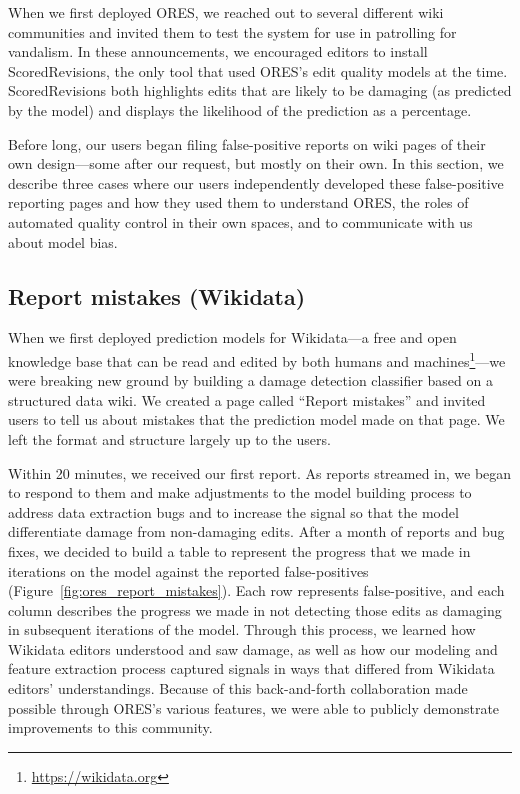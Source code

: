 When we first deployed ORES, we reached out to several different wiki communities and invited them to test the system for use in patrolling for vandalism.  In these announcements, we encouraged editors to install ScoredRevisions, the only tool that used ORES's edit quality models at the time.  ScoredRevisions both highlights edits that are likely to be damaging (as predicted by the model) and displays the likelihood of the prediction as a percentage.

Before long, our users began filing false-positive reports on wiki pages of their own design---some after our request, but mostly on their own.  In this section, we describe three cases where our users independently developed these false-positive reporting pages and how they used them to understand ORES, the roles of automated quality control in their own spaces, and to communicate with us about model bias.

\subsection{Report mistakes (Wikidata)}

When we first deployed prediction models for Wikidata---a free and open knowledge base that can be read and edited by both humans and machines\footnote{\url{https://wikidata.org}}---we were breaking new ground by building a damage detection classifier based on a structured data wiki\cite{sarabadani2017building}.  We created a page called ``Report mistakes'' and invited users to tell us about mistakes that the prediction model made on that page. We left the format and structure largely up to the users.

Within 20 minutes, we received our first report.  As reports streamed in, we began to respond to them and make adjustments to the model building process to address data extraction bugs and to increase the signal so that the model differentiate damage from non-damaging edits.  After a month of reports and bug fixes, we decided to build a table to represent the progress that we made in iterations on the model against the reported false-positives (Figure~\ref{fig:ores_report_mistakes}).  Each row represents false-positive, and each column describes the progress we made in not detecting those edits as damaging in subsequent iterations of the model.  Through this process, we learned how Wikidata editors understood and saw damage, as well as how our modeling and feature extraction process captured signals in ways that differed from Wikidata editors' understandings.  Because of this back-and-forth collaboration made possible through ORES's various features, we were able to publicly demonstrate improvements to this community.

